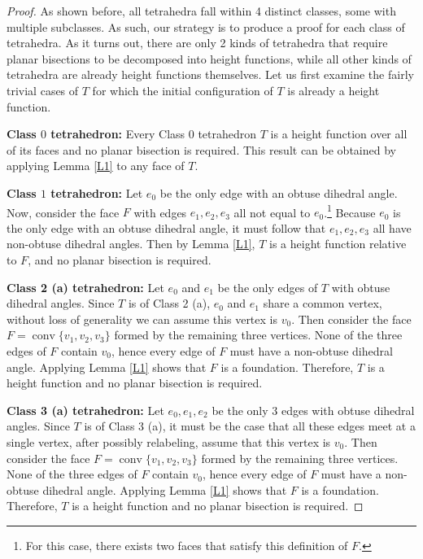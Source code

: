 \documentclass{mainresearch}
\begin{document}
\begin{proof}
	
	As shown before, all tetrahedra fall within 4 distinct classes, some with multiple subclasses. As such, our strategy is to produce a proof for each class of tetrahedra. As it turns out, there are only 2 kinds of tetrahedra that require planar bisections to be decomposed into height functions, while all other kinds of tetrahedra are already height functions themselves. Let us first examine the fairly trivial cases of $T$ for which the initial configuration of $T$ is already a height function.
	
	\bigskip
	
	\noindent\textbf{Class $0$ tetrahedron:} Every Class 0 tetrahedron $T$ is a height function over all of its faces and no planar bisection is required. This result can be obtained by applying Lemma \ref{L1} to any face of $T$. 
	
	\bigskip
	
	\noindent\textbf{Class $1$ tetrahedron:} Let $e_0$ be the only edge with an obtuse dihedral angle. Now, consider the face $F$ with edges $e_1,e_2,e_3$ all not equal to $e_0$.\footnote{For this case, there exists two faces that satisfy this definition of $F$.} Because $e_0
	$ is the only edge with an obtuse dihedral angle, it must follow that $e_1,e_2,e_3$ all have non-obtuse dihedral angles. Then by Lemma \ref{L1}, $T$ is a height function relative to $F$, and no planar bisection is required. 
	
	\bigskip
	
	\noindent\textbf{Class 2 (a) tetrahedron:} Let $e_0$ and $e_1$ be the only edges of $T$ with obtuse dihedral angles. Since $T$ is of Class 2 (a), $e_0$ and $e_1$ share a common vertex, without loss of generality we can assume this vertex is $v_0$. Then consider the face $F=\operatorname{conv}\{v_1,v_2,v_3\}$ formed by the remaining three vertices. None of the three edges of $F$ contain $v_0$, hence every edge of $F$ must have a non-obtuse dihedral angle. Applying Lemma \ref{L1} shows that $F$ is a foundation. Therefore, $T$ is a height function and no planar bisection is required. 
	
	\bigskip
	
	\noindent\textbf{Class 3 (a) tetrahedron:} Let $e_0,e_1,e_2$ be the only 3 edges with obtuse dihedral angles. Since $T$ is of Class 3 (a), it must be the case that all these edges meet at a single vertex, after possibly relabeling, assume that this vertex is $v_0$. Then consider the face $F = \operatorname{conv}\{v_1,v_2,v_3\}$ formed by the remaining three vertices. None of the three edges of $F$ contain $v_0$, hence every edge of $F$ must have a non-obtuse dihedral angle. Applying Lemma \ref{L1} shows that $F$ is a foundation. Therefore, $T$ is a height function and no planar bisection is required. 
	

\end{proof}
\end{document}
